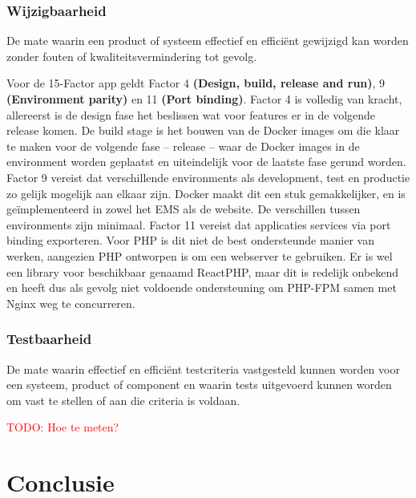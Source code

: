 \subsubsection{Wijzigbaarheid}
De mate waarin een product of systeem effectief en efficiënt gewijzigd kan worden zonder fouten of kwaliteitsvermindering tot gevolg.

Voor de 15-Factor app geldt Factor 4 \textbf{(Design, build, release and run)}, 9 \textbf{(Environment parity)} en 11 \textbf{(Port binding)}. Factor 4 is volledig van kracht, allereerst is de design fase het beslissen wat voor features er in de volgende release komen. De build stage is het bouwen van de Docker images om die klaar te maken voor de volgende fase -- release -- waar de Docker images in de environment worden geplaatst en uiteindelijk voor de laatste fase gerund worden. Factor 9 vereist dat verschillende environments als development, test en productie zo gelijk mogelijk aan elkaar zijn. Docker maakt dit een stuk gemakkelijker, en is geïmplementeerd in zowel het EMS als de website. De verschillen tussen environments zijn minimaal. Factor 11 vereist dat applicaties services via port binding exporteren. Voor PHP is dit niet de best ondersteunde manier van werken, aangezien PHP ontworpen is om een webserver te gebruiken. Er is wel een library voor beschikbaar genaamd ReactPHP, maar dit is redelijk onbekend en heeft dus als gevolg niet voldoende ondersteuning om PHP-FPM samen met Nginx weg te concurreren.

\subsubsection{Testbaarheid}
De mate waarin effectief en efficiënt testcriteria vastgesteld kunnen worden voor een systeem, product of component en waarin tests uitgevoerd kunnen worden om vast te stellen of aan die criteria is voldaan.

\textcolor{red}{TODO: Hoe te meten?} %

\section{Conclusie}
